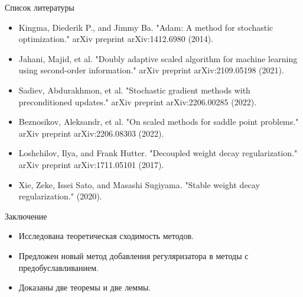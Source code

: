 \documentclass[aspectratio=169, 12pt]{beamer}
\begin{document}
\begin{frame}{Список литературы}
    \begin{itemize}
        \item Kingma, Diederik P., and Jimmy Ba. "Adam: A method for stochastic optimization." arXiv preprint arXiv:1412.6980 (2014).
        \item Jahani, Majid, et al. "Doubly adaptive scaled algorithm for machine learning using second-order information." arXiv preprint arXiv:2109.05198 (2021).
        \item Sadiev, Abdurakhmon, et al. "Stochastic gradient methods with preconditioned updates." arXiv preprint arXiv:2206.00285 (2022).
        \item Beznosikov, Aleksandr, et al. "On scaled methods for saddle point problems." arXiv preprint arXiv:2206.08303 (2022).
        \item Loshchilov, Ilya, and Frank Hutter. "Decoupled weight decay regularization." arXiv preprint arXiv:1711.05101 (2017).
        \item Xie, Zeke, Issei Sato, and Masashi Sugiyama. "Stable weight decay regularization." (2020).
    \end{itemize}
\end{frame}

\begin{frame}{Заключение}
    \begin{itemize}
        \item Исследована теоретическая сходимость методов.
        \item Предложен новый метод добавления регуляризатора в методы с предобуславливанием.
        \item Доказаны две теоремы и две леммы.
    \end{itemize}
\end{frame}
\end{document}
